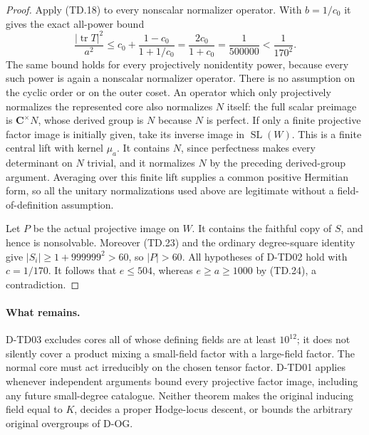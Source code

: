 \begin{proof}
Apply (TD.18) to every nonscalar normalizer operator.
With \(b=1/c_0\) it gives the exact all-power bound
\[
 \frac{|\operatorname{tr}T|^2}{a^2}
 \le c_0+\frac{1-c_0}{1+1/c_0}
     =\frac{2c_0}{1+c_0}
     =\frac1{500000}<\frac1{170^2}.
 \tag{TD.25}
\]
The same bound holds for every projectively nonidentity power,
because every such power is again a nonscalar normalizer operator.
There is no assumption on the cyclic order or on the outer coset.
An operator which only projectively normalizes the represented
core also normalizes \(N\) itself: the full scalar preimage is
\(\mathbf C^\times N\), whose derived group is \(N\) because
\(N\) is perfect.
If only a finite projective factor image is initially given, take
its inverse image in \(\operatorname{SL}(W)\).  This is a finite
central lift with kernel \(\mu_a\).  It contains \(N\), since
perfectness makes every determinant on \(N\) trivial, and it
normalizes \(N\) by the preceding derived-group argument.
Averaging over this finite lift supplies a common positive
Hermitian form, so all the unitary normalizations used above
are legitimate without a field-of-definition assumption.

Let \(P\) be the actual projective image on \(W\).
It contains the faithful copy of \(S\), and hence is nonsolvable.
Moreover (TD.23) and the ordinary degree-square identity give
\(|S_i|\ge1+999999^2>60\), so \(|P|>60\).
All hypotheses of D-TD02 hold with \(c=1/170\).
It follows that \(e\le504\), whereas
\(e\ge a\ge1000\) by (TD.24), a contradiction.
\end{proof}

\paragraph{What remains.}
D-TD03 excludes cores all of whose defining fields are at least
\(10^{12}\); it does not silently cover a product mixing a small-field
factor with a large-field factor.
The normal core must act irreducibly on the chosen tensor factor.
D-TD01 applies whenever independent arguments bound every projective
factor image, including any future small-degree catalogue.
Neither theorem makes the original inducing field equal to \(K\),
decides a proper Hodge-locus descent, or bounds the arbitrary original
overgroups of D-OG.
